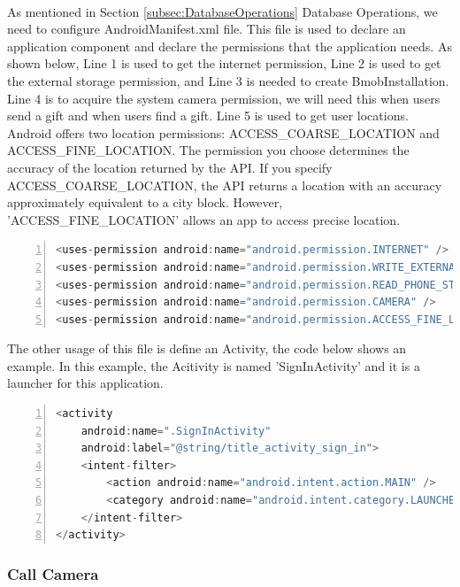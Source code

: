\paragraph{} As mentioned in Section \ref{subsec:DatabaseOperations} Database Operations, we need to configure AndroidManifest.xml file. This file is used to declare an application component and declare the permissions that the application needs. As shown below, Line 1 is used to get the internet permission, Line 2 is used to get the external storage permission, and Line 3 is needed to create BmobInstallation. Line 4 is to acquire the system camera permission, we will need this when users send a gift and when users find a gift. Line 5 is used to get user locations. Android offers two location permissions: ACCESS\_COARSE\_LOCATION and ACCESS\_FINE\_LOCATION. The permission you choose determines the accuracy of the location returned by the API. If you specify ACCESS\_COARSE\_LOCATION, the API returns a location with an accuracy approximately equivalent to a city block. However, 'ACCESS\_FINE\_LOCATION' allows an app to access precise location.
\begin{lstlisting}[language={java},
        numbers=left,basicstyle=\footnotesize\ttfamily,breaklines=true,xleftmargin=.05\textwidth, xrightmargin=.05\textwidth] 
<uses-permission android:name="android.permission.INTERNET" />
<uses-permission android:name="android.permission.WRITE_EXTERNAL_STORAGE" />
<uses-permission android:name="android.permission.READ_PHONE_STATE" />
<uses-permission android:name="android.permission.CAMERA" />
<uses-permission android:name="android.permission.ACCESS_FINE_LOCATION" />
\end{lstlisting} 
\par The other usage of this file is define an Activity, the code below shows an example. In this example, the Acitivity is named 'SignInActivity' and it is a launcher for this application.
\begin{lstlisting}[language={java},
        numbers=left,basicstyle=\footnotesize\ttfamily,breaklines=true,xleftmargin=.05\textwidth, xrightmargin=.05\textwidth] 
<activity
    android:name=".SignInActivity"
    android:label="@string/title_activity_sign_in">
    <intent-filter>
        <action android:name="android.intent.action.MAIN" />
        <category android:name="android.intent.category.LAUNCHER" />
    </intent-filter>
</activity>
\end{lstlisting} 

\subsubsection{Call Camera}
\label{CallCamera}
